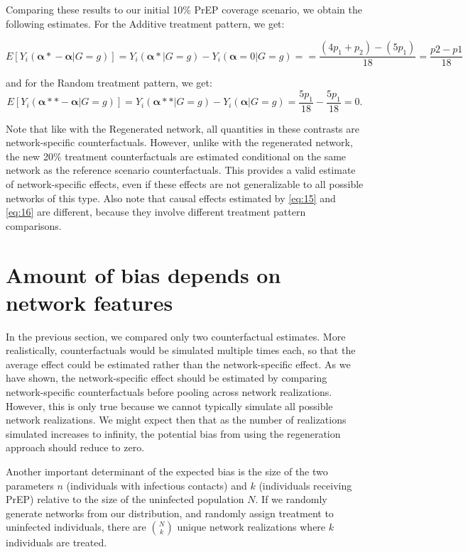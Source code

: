 \documentclass{article}
\theoremstyle{definition}
\begin{document}
Comparing these results to our initial 10\% PrEP coverage scenario, we obtain the following estimates. For the Additive treatment pattern, we get:

\begin{equation}\label{eq:15}
E\left[Y_{i}\left(\mathbf{\alpha*}-\mathbf{\alpha}|G=g\right)\right] =  Y_{i}\left(\mathbf{\alpha*}|G=g\right) -Y_{i}\left(\mathbf{\alpha}= 0|G=g\right) = 
= \frac{\left(4p_1+p_2\right)-\left(5p_1\right)}{18}=
\frac{p2-p1}{18}
\end{equation}

and for the Random treatment pattern, we get:
\begin{equation}\label{eq:16}
E\left[Y_{i}\left(\mathbf{\alpha**}-\mathbf{\alpha}|G=g\right)\right] =Y_{i}\left(\mathbf{\alpha**}|G=g\right) -Y_{i}\left(\mathbf{\alpha}|G=g\right) = \frac{5p_1}{18} - \frac{5p_1}{18} =0.
\end{equation}

Note that like with the Regenerated network, all quantities in these contrasts are network-specific counterfactuals. However, unlike with the regenerated network, the new 20\% treatment counterfactuals are estimated conditional on the same network as the reference scenario counterfactuals. This provides a valid estimate of network-specific effects, even if these effects are not generalizable to all possible networks of this type. Also note that causal effects estimated by \ref{eq:15} and \ref{eq:16} are different, because they involve different treatment pattern comparisons.


\section{Amount of bias depends on network features}
In the previous section, we compared only two counterfactual estimates. More realistically, counterfactuals would be simulated multiple times each, so that the average effect could be estimated rather than the network-specific effect. As we have shown, the network-specific effect should be estimated by comparing network-specific counterfactuals before pooling across network realizations. However, this is only true because we cannot typically simulate all possible network realizations. We might expect then that as the number of realizations simulated increases to infinity, the potential bias from using the regeneration approach should reduce to zero.

Another important determinant of the expected bias is the size of the two parameters $n$ (individuals with infectious contacts) and $k$ (individuals receiving PrEP) relative to the size of the uninfected population $N$. If we randomly generate networks from our distribution, and randomly assign treatment to uninfected individuals, there are $\binom{N}{k}$ unique network realizations where $k$ individuals are treated. 
\end{document}

